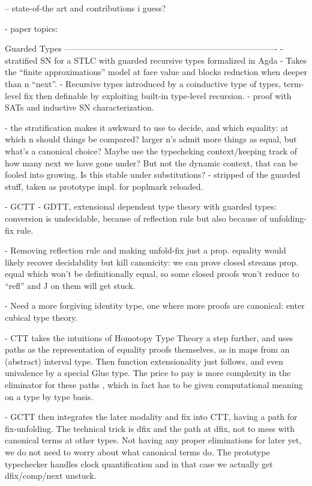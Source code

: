 -- state-of-the art and contributions i guess?

- paper topics:

  Guarded Types
  ----------------------------------------------------------------------------
  - stratified SN for a STLC with guarded recursive types formalized in Agda
    - Takes the ``finite approximations'' model at face value and blocks reduction when deeper than n ``next''.
    - Recursive types introduced by a coinductive type of types, term-level fix then definable by exploiting built-in type-level recursion.
    - proof with SATs and inductive SN characterization.
    
    - the stratification makes it awkward to use to decide, and which
    equality: at which n should things be compared? larger n's admit
    more things as equal, but what's a canonical choice?
    Maybe use the typecheking context/keeping track of how many next
    we have gone under? But not the dynamic context, that can be
    fooled into growing. Is this stable under substitutions?    
    - stripped of the guarded stuff, taken as prototype impl. for poplmark reloaded.
    
  - GCTT
    - GDTT, extensional dependent type theory with guarded types:
    conversion is undecidable, because of reflection rule but also
    because of unfolding-fix rule.
    
    - Removing reflection rule and making unfold-fix just a
    prop. equality would likely recover decidability but kill
    canonicity: we can prove closed streams prop. equal which won't be
    definitionally equal, so some closed proofs won't reduce to
    ``refl'' and J on them will get stuck.

    - Need a more forgiving identity type, one where more proofs are
    canonical: enter cubical type theory.
    
     - CTT takes the intuitions of Homotopy Type Theory a step
     further, and uses paths as the representation of equality proofs themselves,
     as in maps from an (abstract) interval type.
     Then function extensionality just follows, and even univalence by a special Glue type.
     The price to pay is more complexity in the eliminator for these paths
     , which in fact has to be given computational meaning on a type by type basis.

   - GCTT then integrates the later modality and fix into CTT, having a path for fix-unfolding.
     The technical trick is dfix and the path at dfix, not to mess with canonical terms at other types.
     Not having any proper eliminations for later yet, we do not need to worry about what canonical terms do.
     The prototype typechecker handles clock quantification and in that case we actually get dfix/comp/next unstuck.
     
